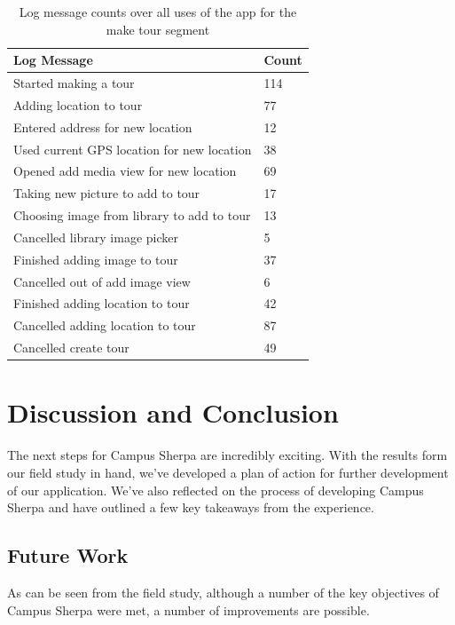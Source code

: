\documentclass{sigchi}
\begin{document}
\begin{table}
\begin{tabular}{|l|l|}\hline
\textbf{Log Message} & \textbf{Count} \\ \hline
 Started making a tour & 114 \\ \hline
 Adding location to tour & 77 \\ \hline
 Entered address for new location & 12 \\ \hline
 Used current GPS location for new location & 38 \\ \hline
 Opened add media view for new location & 69 \\ \hline
 Taking new picture to add to tour & 17 \\ \hline
 Choosing image from library to add to tour & 13 \\ \hline
 Cancelled library image picker & 5 \\ \hline
 Finished adding image to tour & 37 \\ \hline
 Cancelled out of add image view & 6 \\ \hline
 Finished adding location to tour & 42 \\ \hline
 Cancelled adding location to tour & 87 \\ \hline
 Cancelled create tour & 49 \\ \hline
\end{tabular}
\caption{Log message counts over all uses of the app for the make tour segment}
\label{logging-results-make}
\end{table}

\section{Discussion and Conclusion}

The next steps for Campus Sherpa are incredibly exciting. With the results form our field study in hand, we've developed a plan of action for further development of our application. We've also reflected on the process of developing Campus Sherpa and have outlined a few key takeaways from the experience.

\subsection{Future Work}

As can be seen from the field study, although a number of the key objectives of Campus Sherpa were met, a number of improvements are possible. 
\end{document}
